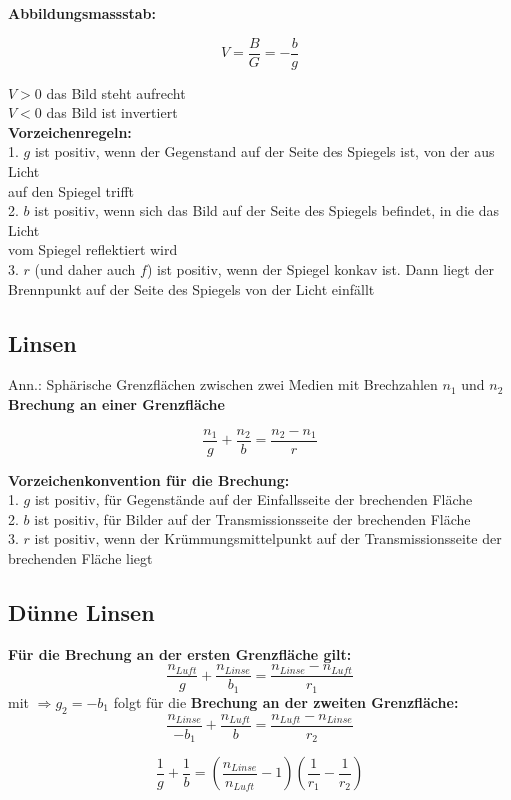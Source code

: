 \textbf{Abbildungsmassstab:}
\begin{formulabox}
    \[
        V = \frac{B}{G} = -\frac{b}{g}
    \]
\end{formulabox}
$V > 0$ das Bild steht aufrecht\\
$V < 0$ das Bild ist invertiert \\[1ex]

\textbf{Vorzeichenregeln:} \\
1. $g$ ist positiv, wenn der Gegenstand auf der Seite des Spiegels ist, von der aus Licht \\ \hspace{2.3mm} auf den Spiegel trifft \\
2. $b$ ist positiv, wenn sich das Bild auf der Seite des Spiegels befindet, in die das Licht \\ \hspace{2.3mm} vom Spiegel reflektiert wird \\
3. $r$ (und daher auch $f$) ist positiv, wenn der Spiegel konkav ist. Dann liegt der \\ \hspace{2.3mm} Brennpunkt auf der Seite des Spiegels von der Licht einfällt 

\subsection{Linsen}
Ann.: Sphärische Grenzflächen zwischen zwei Medien mit Brechzahlen $n_1$ und $n_2$ \\[1ex]
\textbf{Brechung an einer Grenzfläche}
\begin{formulabox}
    \[
        \frac{n_1}{g} + \frac{n_2}{b} = \frac{n_2 - n_1}{r}
    \]
\end{formulabox}

\textbf{Vorzeichenkonvention für die Brechung:} \\
1. $g$ ist positiv, für Gegenstände auf der Einfallsseite der brechenden Fläche \\
2. $b$ ist positiv, für Bilder auf der Transmissionsseite der brechenden Fläche \\
3. $r$ ist positiv, wenn der Krümmungsmittelpunkt auf der Transmissionsseite der brechenden Fläche liegt

\subsection{Dünne Linsen}
\textbf{Für die Brechung an der ersten Grenzfläche gilt:}
\[
    \frac{n_{Luft}}{g} + \frac{n_{Linse}}{b_1} = \frac{n_{Linse} - n_{Luft}}{r_1}
\]
mit $\Rightarrow g_2 = -b_1$ folgt für die \textbf{Brechung an der zweiten Grenzfläche:}
\[
    \frac{n_{Linse}}{-b_1} + \frac{n_{Luft}}{b} = \frac{n_{Luft} - n_{Linse}}{r_2}
\]
\begin{formulabox}
    \[
        \frac{1}{g} + \frac{1}{b} = \left( \frac{n_{Linse}}{n_{Luft}} -1 \right) \left( \frac{1}{r_1} - \frac{1}{r_2} \right)
    \]
\end{formulabox}

